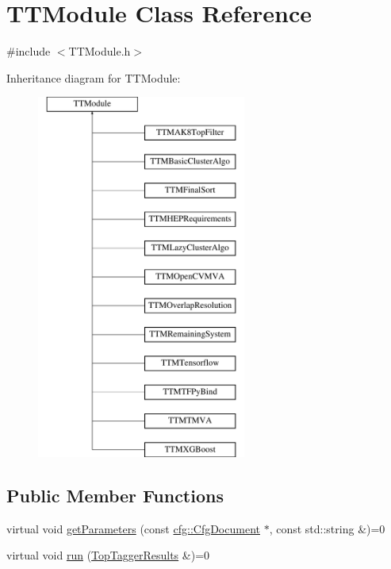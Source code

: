 \hypertarget{classTTModule}{\section{T\-T\-Module Class Reference}
\label{classTTModule}
}


{\ttfamily \#include $<$T\-T\-Module.\-h$>$}

Inheritance diagram for T\-T\-Module\-:\begin{figure}[H]
\begin{center}
\leavevmode
\includegraphics[height=12.000000cm]{classTTModule}
\end{center}
\end{figure}
\subsection*{Public Member Functions}
\begin{DoxyCompactItemize}
\item 
virtual void \hyperlink{classTTModule_aa9d2842c9e94782059fe92044a68e3a6}{get\-Parameters} (const \hyperlink{classcfg_1_1CfgDocument}{cfg\-::\-Cfg\-Document} $\ast$, const std\-::string \&)=0
\item 
virtual void \hyperlink{classTTModule_a14e7c03fbf4ee1a5008c9344adc7c896}{run} (\hyperlink{classTopTaggerResults}{Top\-Tagger\-Results} \&)=0
\end{DoxyCompactItemize}


